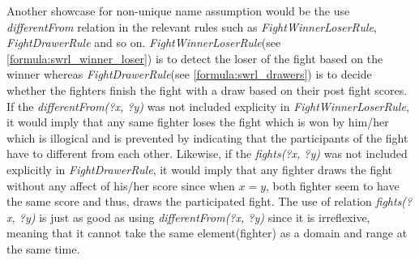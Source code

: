 \documentclass[a4paper]{article}
\begin{document}
Another showcase for non-unique name assumption would be the use \textit{differentFrom} relation in the relevant rules such as \textit{FightWinnerLoserRule}, \textit{FightDrawerRule} and so on. 
\textit{FightWinnerLoserRule}(see \ref{formula:swrl_winner_loser}) is to detect the loser of the fight based on the winner whereas \textit{FightDrawerRule}(see \ref{formula:swrl_drawers}) is to decide whether 
the fighters finish the fight with a draw based on their post fight scores. If the \textit{differentFrom(?x, ?y)} was not included explicity in \textit{FightWinnerLoserRule}, it would imply that 
any same fighter loses the fight which is won by him/her which is illogical and is prevented by indicating that the participants of the fight have to different from each other. Likewise, if the 
\textit{fights(?x, ?y)} was not included explicitly in \textit{FightDrawerRule}, it would imply that any fighter draws the fight without any affect of his/her score since when $x=y$, both fighter 
seem to have the same score and thus, draws the participated fight. The use of relation \textit{fights(?x, ?y)} is just as good as using \textit{differentFrom(?x, ?y)} since it is irreflexive, 
meaning that it cannot take the same element(fighter) as a domain and range at the same time.
\end{document}

